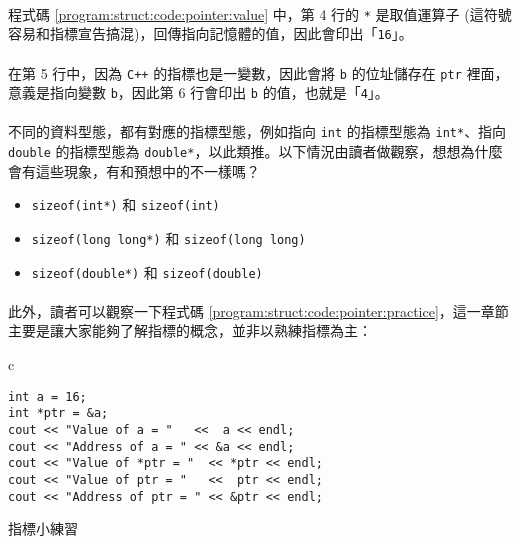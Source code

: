 \documentclass[12pt,a4paper,oneside]{article}
\begin{document}
\begin{CJK}{UTF8}{bkai}
\paragraph{}程式碼 \ref{program:struct:code:pointer:value} 中，第 4 行的 \lstinline!*! 是取值運算子 (這符號容易和指標宣告搞混)，回傳指向記憶體的值，因此會印出「\lstinline!16!」。
\paragraph{}在第 5 行中，因為 \texttt{C++} 的指標也是一變數，因此會將 \lstinline!b! 的位址儲存在 \lstinline!ptr! 裡面，意義是指向變數 \lstinline!b!，因此第 6 行會印出 \lstinline!b! 的值，也就是「\lstinline!4!」。

\paragraph{}不同的資料型態，都有對應的指標型態，例如指向 \lstinline!int! 的指標型態為 \lstinline!int*!、指向 \lstinline!double! 的指標型態為 \lstinline!double*!，以此類推。以下情況由讀者做觀察，想想為什麼會有這些現象，有和預想中的不一樣嗎？
\begin{itemize}
\item \lstinline!sizeof(int*)! 和 \lstinline!sizeof(int)!
\item \lstinline!sizeof(long long*)! 和 \lstinline!sizeof(long long)!
\item \lstinline!sizeof(double*)! 和 \lstinline!sizeof(double)!
\end{itemize}

\paragraph{}此外，讀者可以觀察一下程式碼 \ref{program:struct:code:pointer:practice}，這一章節主要是讓大家能夠了解指標的概念，並非以熟練指標為主：

\begin{code}[h!]
  \centering
  \begin{tabular}{c}
  \begin{lstlisting}
int a = 16;
int *ptr = &a;
cout << "Value of a = "   <<  a << endl;
cout << "Address of a = " << &a << endl;
cout << "Value of *ptr = "  << *ptr << endl;
cout << "Value of ptr = "   <<  ptr << endl;
cout << "Address of ptr = " << &ptr << endl;
  \end{lstlisting}
  \end{tabular}
  \caption{指標小練習}
  \label{program:struct:code:pointer:practice}
\end{code}


\end{CJK}
\end{document}
